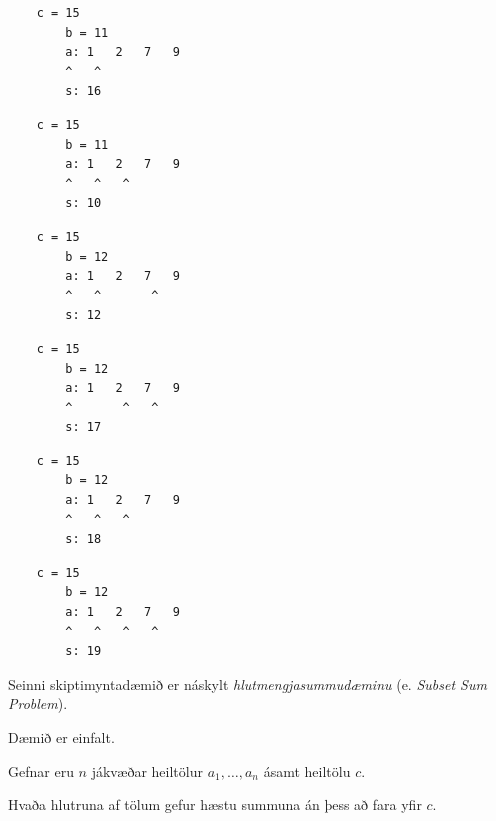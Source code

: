 { \begin{verbatim}
    c = 15
        b = 11
        a: 1   2   7   9
        ^   ^    
        s: 16
        \end{verbatim} }

{ \begin{verbatim}
    c = 15
        b = 11
        a: 1   2   7   9
        ^   ^   ^        
        s: 10
        \end{verbatim} }

{ \begin{verbatim}
    c = 15
        b = 12
        a: 1   2   7   9
        ^   ^       ^    
        s: 12
        \end{verbatim} }

{ \begin{verbatim}
    c = 15
        b = 12
        a: 1   2   7   9
        ^       ^   ^    
        s: 17
        \end{verbatim} }

{ \begin{verbatim}
    c = 15
        b = 12
        a: 1   2   7   9
        ^   ^   ^    
        s: 18
        \end{verbatim} }

{ \begin{verbatim}
    c = 15
        b = 12
        a: 1   2   7   9
        ^   ^   ^   ^    
        s: 19
        \end{verbatim} }

{
    {
        \item<1-> Seinni skiptimyntadæmið er náskylt \emph{hlutmengjasummudæminu} (e. \emph{Subset Sum Problem}).
            \item<2-> Dæmið er einfalt.
            \item<3-> Gefnar eru $n$ jákvæðar heiltölur $a_1, \dots, a_n$ ásamt heiltölu $c$.
            \item<4-> Hvaða hlutruna af tölum gefur hæstu summuna án þess að fara yfir $c$.
    }
}

{
}


